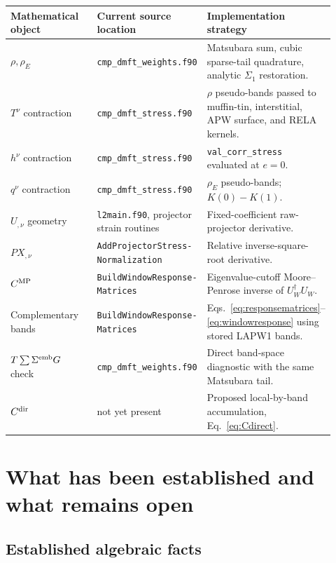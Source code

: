 \documentclass[11pt]{article}
\numberwithin{equation}{section}
\newcommand{\code}[1]{\texttt{#1}}
\begin{document}
\begin{longtable}{p{0.28\linewidth}p{0.31\linewidth}p{0.33\linewidth}}
\toprule
Mathematical object & Current source location & Implementation strategy\\
\midrule
$\rho,\rho_E$ & \code{cmp\_dmft\_weights.f90} & Matsubara sum, cubic sparse-tail quadrature, analytic $\Sigma_1$ restoration.\\
$T^\nu$ contraction & \code{cmp\_dmft\_stress.f90} & $\rho$ pseudo-bands passed to muffin-tin, interstitial, APW surface, and RELA kernels.\\
$h^\nu$ contraction & \code{cmp\_dmft\_stress.f90} & \code{val\_corr\_stress} evaluated at $e=0$.\\
$q^\nu$ contraction & \code{cmp\_dmft\_stress.f90} & $\rho_E$ pseudo-bands; $K(0)-K(1)$.\\
$U_{,\nu}$ geometry & \code{l2main.f90}, projector strain routines & Fixed-coefficient raw-projector derivative.\\
$PX_{,\nu}$ & \texttt{AddProjectorStress-}\newline\texttt{Normalization} & Relative inverse-square-root derivative.\\
$C^{\rm MP}$ & \texttt{BuildWindowResponse-}\newline\texttt{Matrices} & Eigenvalue-cutoff Moore--Penrose inverse of $U_W^\dagger U_W$.\\
Complementary bands & \texttt{BuildWindowResponse-}\newline\texttt{Matrices} & Eqs.~\eqref{eq:responsematrices}--\eqref{eq:windowresponse} using stored LAPW1 bands.\\
$T\sum\Sigma^{\rm emb}G$ check & \code{cmp\_dmft\_weights.f90} & Direct band-space diagnostic with the same Matsubara tail.\\
$C^{\rm dir}$ & not yet present & Proposed local-by-band accumulation, Eq.~\eqref{eq:Cdirect}.\\
\bottomrule
\end{longtable}

\section{What has been established and what remains open}

\subsection{Established algebraic facts}
\end{document}
